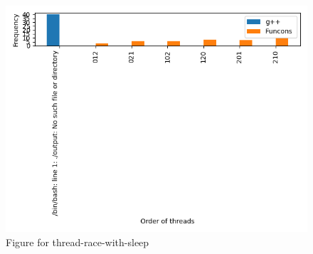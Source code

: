 \begin{figure}[H]
\centering
\includegraphics[width=\textwidth]{thread-race-with-sleep_bar_chart.png}
\caption{Figure for thread-race-with-sleep}
\end{figure}
